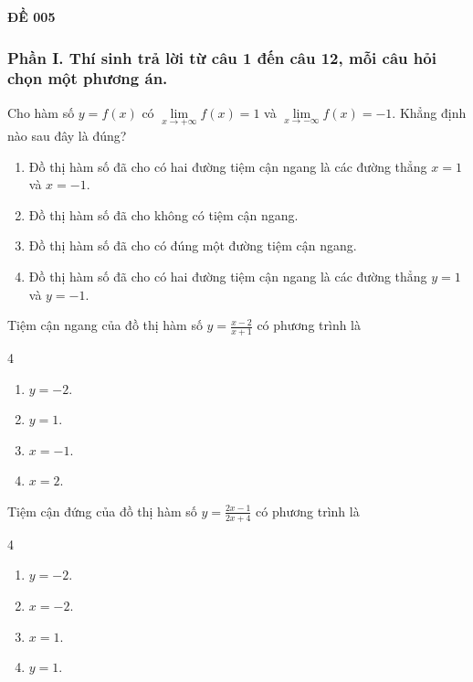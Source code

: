 \begin{center}
	\textbf{{\Huge ĐỀ 005}}
\end{center}
\subsubsection*{Phần I. Thí sinh trả lời từ câu 1 đến câu 12, mỗi câu hỏi chọn một phương án.}
\setcounter{bt}{0}
\begin{baitap}
	Cho hàm số $y=f(x)$ có $\lim\limits_{x \to +\infty} f(x) = 1$ và $\lim\limits_{x \to -\infty} f(x) = -1$. Khẳng định nào sau đây là đúng?
	\begin{enumerate}
		\item Đồ thị hàm số đã cho có hai đường tiệm cận ngang là các đường thẳng $x=1$ và $x=-1$.
		\item Đồ thị hàm số đã cho không có tiệm cận ngang.
		\item Đồ thị hàm số đã cho có đúng một đường tiệm cận ngang.
		\item Đồ thị hàm số đã cho có hai đường tiệm cận ngang là các đường thẳng $y=1$ và $y=-1$.
	\end{enumerate}
\end{baitap}

\begin{baitap}
	Tiệm cận ngang của đồ thị hàm số $y = \frac{x-2}{x+1}$ có phương trình là
	\begin{multicols}{4}
		\begin{enumerate}
			\item $y = -2$.
			\item $y = 1$.
			\item $x = -1$.
			\item $x = 2$.
		\end{enumerate}
	\end{multicols}
\end{baitap}

\begin{baitap}
	Tiệm cận đứng của đồ thị hàm số $y = \frac{2x-1}{2x+4}$ có phương trình là
	\begin{multicols}{4}
		\begin{enumerate}
			\item $y = -2$.
			\item $x = -2$.
			\item $x = 1$.
			\item $y = 1$.
		\end{enumerate}
	\end{multicols}
\end{baitap}

